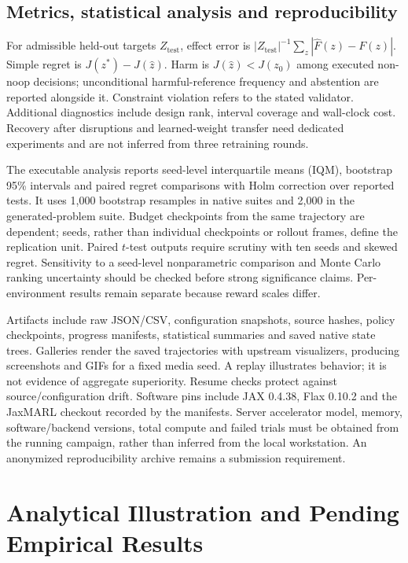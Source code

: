 \documentclass[runningheads]{llncs}
\newcommand{\noop}{z_0}
\begin{document}
\subsection{Metrics, statistical analysis and reproducibility}
For admissible held-out targets $Z_{\mathrm{test}}$, effect error is $|Z_{\mathrm{test}}|^{-1}\sum_z|\hat F(z)-F(z)|$. Simple regret is $J(z^*)-J(\hat z)$. Harm is $J(\hat z)<J(\noop)$ among executed non-noop decisions; unconditional harmful-reference frequency and abstention are reported alongside it. Constraint violation refers to the stated validator. Additional diagnostics include design rank, interval coverage and wall-clock cost. Recovery after disruptions and learned-weight transfer need dedicated experiments and are not inferred from three retraining rounds.

The executable analysis reports seed-level interquartile means (IQM), bootstrap 95\% intervals and paired regret comparisons with Holm correction over reported tests. It uses 1,000 bootstrap resamples in native suites and 2,000 in the generated-problem suite. Budget checkpoints from the same trajectory are dependent; seeds, rather than individual checkpoints or rollout frames, define the replication unit. Paired $t$-test outputs require scrutiny with ten seeds and skewed regret. Sensitivity to a seed-level nonparametric comparison and Monte Carlo ranking uncertainty should be checked before strong significance claims. Per-environment results remain separate because reward scales differ.

Artifacts include raw JSON/CSV, configuration snapshots, source hashes, policy checkpoints, progress manifests, statistical summaries and saved native state trees. Galleries render the saved trajectories with upstream visualizers, producing screenshots and GIFs for a fixed media seed. A replay illustrates behavior; it is not evidence of aggregate superiority. Resume checks protect against source/configuration drift. Software pins include JAX 0.4.38, Flax 0.10.2 and the JaxMARL checkout recorded by the manifests. Server accelerator model, memory, software/backend versions, total compute and failed trials must be obtained from the running campaign, rather than inferred from the local workstation. An anonymized reproducibility archive remains a submission requirement.

\section{Analytical Illustration and Pending Empirical Results}\label{sec:results}
\end{document}
